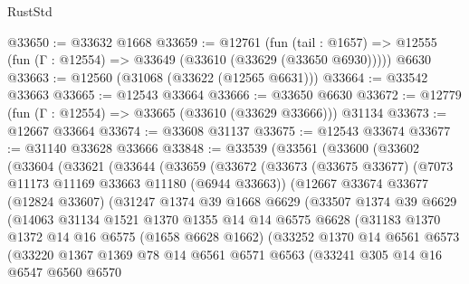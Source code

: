 \begin{lexlean}{RustStd}
\begin{coremodule}
@33650 := @33632 @1668
@33659 := @12761
    (fun (tail : @1657) => @12555 (fun (Γ : @12554) => @33649 (@33610 (@33629 (@33650 @6930)))))
    @6630
@33663 := @12560 (@31068 (@33622 (@12565 @6631)))
@33664 := @33542 @33663
@33665 := @12543 @33664
@33666 := @33650 @6630
@33672 := @12779 (fun (Γ : @12554) => @33665 (@33610 (@33629 @33666))) @31134
@33673 := @12667 @33664
@33674 := @33608 @31137
@33675 := @12543 @33674
@33677 := @31140 @33628 @33666
@33848 := @33539
    (@33561
      (@33600
        (@33602
          (@33604
            (@33621
              (@33644
                (@33659
                  (@33672
                    (@33673
                      (@33675 @33677)
                      (@7073 @11173 @11169 @33663 @11180 (@6944 @33663))
                      (@12667
                        @33674
                        @33677
                        (@12824 @33607)
                        (@31247
                          @1374
                          @39
                          @1668
                          @6629
                          (@33507
                            @1374
                            @39
                            @6629
                            (@14063
                              @31134
                              @1521
                              @1370
                              @1355
                              @14
                              @14
                              @6575
                              @6628
                              (@31183
                                @1370
                                @1372
                                @14
                                @16
                                @6575
                                (@1658 @6628 @1662)
                                (@33252
                                  @1370
                                  @14
                                  @6561
                                  @6573
                                  (@33220
                                    @1367
                                    @1369
                                    @78
                                    @14
                                    @6561
                                    @6571
                                    @6563
                                    (@33241
                                      @305
                                      @14
                                      @16
                                      @6547
                                      @6560
                                      @6570

\end{coremodule}
\end{lexlean}
